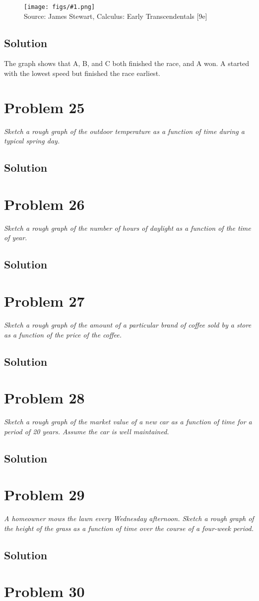 \documentclass[11pt]{article}
\newcommand{\soln}{\subsection*}
\newcommand{\qn}{\textit}
\newcommand{\imagesource}[1]{{\footnotesize Source: #1}}
\newcommand{\imgqn}[1]{
	\begin{figure}[h]
		\centering
		\texttt{[image: figs/\#1.png]}\\
		\imagesource{James Stewart, Calculus: Early Transcendentals [9e]}
	\end{figure}
}
\begin{document}
\imgqn{1.1.24}

\soln{Solution}
The graph shows that A, B, and C both finished the race, and A won. A started with the lowest speed but finished the race earliest.

\section*{Problem 25}

\qn{Sketch a rough graph of the outdoor temperature as a function of time during a typical spring day.}

\soln{Solution}

\section*{Problem 26}

\qn{Sketch a rough graph of the number of hours of daylight as a function of the time of year.}

\soln{Solution}

\section*{Problem 27}

\qn{Sketch a rough graph of the amount of a particular brand of coffee sold by a store as a function of the price of the coffee.}

\soln{Solution}

\section*{Problem 28}

\qn{Sketch a rough graph of the market value of a new car as a function of time for a period of 20 years. Assume the car is well maintained.}

\soln{Solution}

\section*{Problem 29}

\qn{A homeowner mows the lawn every Wednesday afternoon. Sketch a rough graph of the height of the grass as a function of time over the course of a four-week period.}

\soln{Solution}

\section*{Problem 30}
\end{document}
